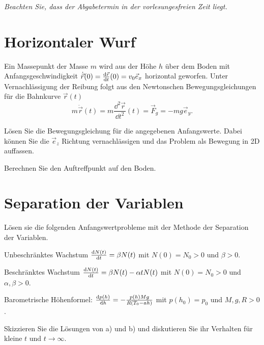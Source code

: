 \documentclass{scrartcl}
\begin{document}
\maketitle

\vspace{\baselineskip}
\emph{%
  Beachten Sie, dass der Abgabetermin in der vorlesungesfreien Zeit liegt.
}

\section{Horizontaler Wurf }
\label{sec:horizontaler_wurf}

Ein Massepunkt der Masse $m$ wird aus der Höhe $h$ über dem Boden mit Anfangsgeschwindigkeit $\dot{\vec r}(0) = \deriv[\vec r]{t}(0) = v_0 \vec e_x$ horizontal geworfen. Unter Vernachlässigung der Reibung folgt aus den Newtonschen Bewegungsgleichungen für die Bahnkurve $\vec r(t)$
\[
  m \ddot{\vec r}(t) = m \frac{\dd^2 \vec r}{\dd t^2}(t) = \vec F_g = - m g \vec e_y.
\]
\begin{subex}
  \item{} Lösen Sie die Bewegungsgleichung für die angegebenen Anfangswerte. Dabei können Sie die $\vec e_z$ Richtung vernachlässigen und das Problem als Bewegung in 2D auffassen.
  \item{} Berechnen Sie den Auftreffpunkt auf den Boden. 
\end{subex}


\section{Separation der Variablen }
\label{sec:separation_der_variablen}

Lösen sie die folgenden Anfangswertprobleme mit der Methode der Separation der Variablen.

\begin{subex}
  \item{} Unbeschränktes Wachstum $\deriv[N(t)]{t} = \beta N(t)$ mit $N(0) = N_0 > 0$ und $\beta > 0$.
  \item{} Beschränktes Wachstum $\deriv[N(t)]{t} = \beta N(t) - \alpha t N(t)$  mit $N(0) = N_0 > 0$ und $ \alpha, \beta > 0$.
  \item{} Barometrische Höhenformel: $\deriv[p(h)]{h} = - \frac{p(h) M g}{R(T_0 - ah)}$ mit $p(h_0) = p_0$ und $M, g, R > 0$.
  \item{} Skizzieren Sie die Lösungen von a) und b) und diskutieren Sie ihr Verhalten für kleine $t$ und $t \to \infty$.
\end{subex}
\end{document}
